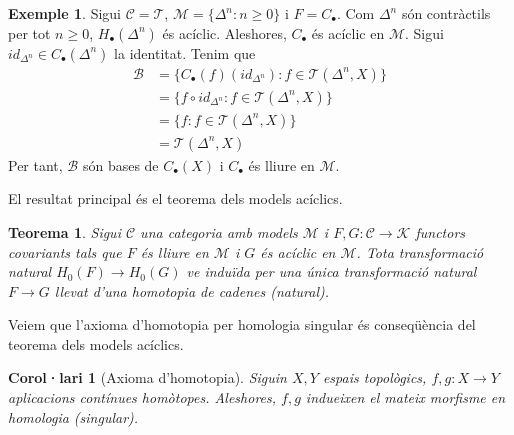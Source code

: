\documentclass[compress]{article}
\newtheorem{corolari}{Corol·lari}
\newtheorem{teorema}{Teorema}
\theoremstyle{definition}
\newtheorem{exemple}{Exemple}
\begin{document}
\begin{exemple}
    Sigui $\mathscr{C}=\mathscr{T}$, $\mathscr{M}=\{\Delta^{n}:n\geq0\}$ i $F=C_{\bullet}$. Com $\Delta^{n}$ són contràctils per tot $n\geq0$, $H_{\bullet}(\Delta^{n})$ és acíclic. Aleshores, $C_{\bullet}$ és acíclic en $\mathscr{M}$. Sigui $id_{\Delta^{n}}\in C_{\bullet}(\Delta^{n})$ la identitat. Tenim que
    \begin{align*}
        \mathscr{B}
        &=\{C_{\bullet}(f)(id_{\Delta^{n}}): f\in\mathscr{T}(\Delta^{n},X)\}\\
        &=\{f\circ id_{\Delta^{n}}:f\in\mathscr{T}(\Delta^{n},X)\}\\
        &=\{f:f\in\mathscr{T}(\Delta^{n},X)\}\\
        &=\mathscr{T}(\Delta^{n},X)
    \end{align*}
    Per tant, $\mathscr{B}$ són bases de $C_{\bullet}(X)$ i $C_{\bullet}$ és lliure en $\mathscr{M}$.
\end{exemple}
El resultat principal és el teorema dels models acíclics.
\begin{teorema}
    Sigui $\mathscr{C}$ una categoria amb models $\mathscr{M}$ i $F,G:\mathscr{C}\rightarrow\mathscr{K}$ functors covariants tals que $F$ és lliure en $\mathscr{M}$ i $G$ és acíclic en $\mathscr{M}$. Tota transformació natural $H_{0}(F)\rightarrow H_{0}(G)$ ve induïda per una única transformació natural $F\rightarrow G$ llevat d'una homotopia de cadenes (natural).
\end{teorema}
Veiem que l'axioma d'homotopia per homologia singular és conseqüència del teorema dels models acíclics.
\begin{corolari}[Axioma d'homotopia]
    Siguin $X,Y$ espais topològics, $f,g:X\rightarrow Y$ aplicacions contínues homòtopes. Aleshores, $f,g$ indueixen el mateix morfisme en homologia (singular).
\end{corolari}
\end{document}
